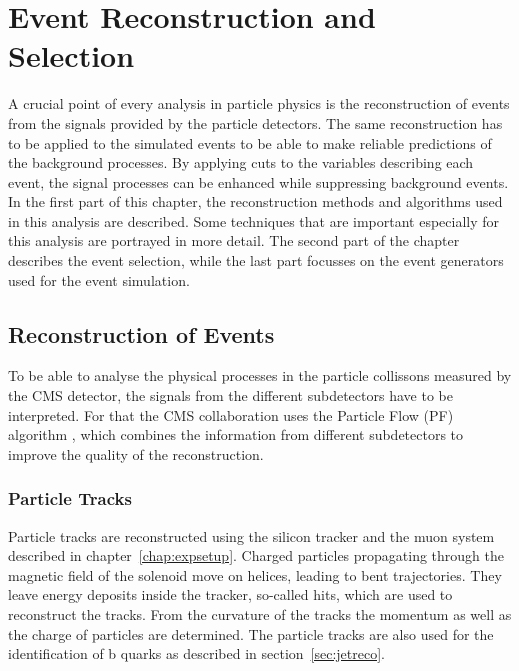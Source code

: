 \chapter{Event Reconstruction and Selection}
\label{chap::EventReconstructionandSelection}
A crucial point of every analysis in particle physics is the reconstruction of events from the signals provided by the particle detectors. The same reconstruction has to be applied to the simulated events to be able to make reliable predictions of the background processes. By applying cuts to the variables describing each event, the signal processes can be enhanced while suppressing background events.\\

\noindent In the first part of this chapter, the reconstruction methods and algorithms used in this analysis are described. Some techniques that are important especially for this analysis are portrayed in more detail. The second part of the chapter describes the event selection, while the last part focusses on the event generators used for the event simulation.
\section{Reconstruction of Events}
To be able to analyse the physical processes in the particle collissons measured by the CMS detector, the signals from the different subdetectors have to be interpreted. For that the CMS collaboration uses the Particle Flow (PF) algorithm \cite{PF1,PF2}, which combines the information from different subdetectors to improve the quality of the reconstruction.
\subsection{Particle Tracks}
Particle tracks are reconstructed using the silicon tracker and the muon system described in chapter~\ref{chap:expsetup}. Charged particles propagating through the magnetic field of the solenoid move on helices, leading to bent trajectories. They leave energy deposits inside the tracker, so-called hits, which are used to reconstruct the tracks. From the curvature of the tracks the momentum as well as the charge of particles are determined. The particle tracks are also used for the identification of b quarks as described in section~\ref{sec:jetreco}.\\

